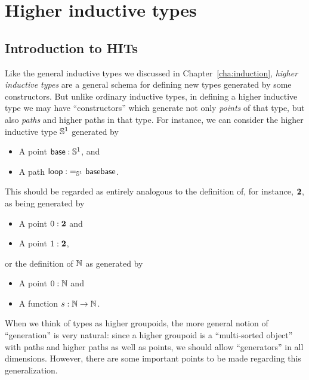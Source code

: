 \newcommand{\base}{\ensuremath{\mathsf{base}}\xspace}
\newcommand{\lloop}{\ensuremath{\mathsf{loop}}\xspace}
\newcommand{\seg}{\ensuremath{\mathsf{seg}}\xspace}
\newcommand{\eqtopath}{\ensuremath{\mathsf{eqtopath}}\xspace}

\chapter{Higher inductive types}
\label{cha:hits}

\section{Introduction to HITs}
\label{sec:intro-hits}

Like the general inductive types we discussed in Chapter~\ref{cha:induction}, \emph{higher inductive types} are a general schema for defining new types generated by some constructors.
But unlike ordinary inductive types, in defining a higher inductive type we may have ``constructors'' which generate not only \emph{points} of that type, but also \emph{paths} and higher paths in that type.
For instance, we can consider the higher inductive type $\mathbb{S}^1$ generated by
\begin{itemize}
\item A point $\base:\Sn^1$, and
\item A path $\lloop : {\id[\Sn^1]\base\base}$.
\end{itemize}
This should be regarded as entirely analogous to the definition of, for instance, $\mathbf{2}$, as being generated by
\begin{itemize}
\item A point $0:\mathbf{2}$ and
\item A point $1:\mathbf{2}$,
\end{itemize}
or the definition of $\mathbb{N}$ as generated by
\begin{itemize}
\item A point $0:\mathbb{N}$ and
\item A function $s:\mathbb{N}\to\mathbb{N}$.
\end{itemize}
When we think of types as higher groupoids, the more general notion of ``generation'' is very natural:
since a higher groupoid is a ``multi-sorted object'' with paths and higher paths as well as points, we should allow ``generators'' in all dimensions.
However, there are some important points to be made regarding this generalization.

